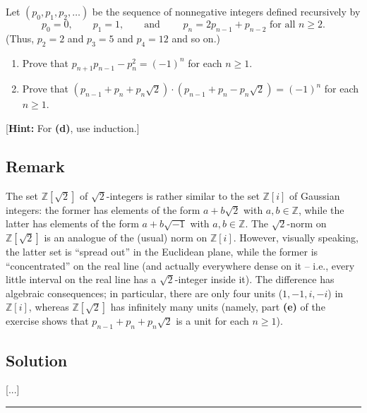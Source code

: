 \documentclass[paper=a4, fontsize=12pt]{scrartcl} %
\newcommand{\ZZ}{\mathbb{Z}} %
\newcommand{\tup}[1]{\left( #1 \right)}
\newcommand{\ive}[1]{\left[ #1 \right]}
\newcommand{\horrule}[1]{\rule{\linewidth}{#1}} %
\theoremstyle{plainsl}
\theoremstyle{definition}
\theoremstyle{remark}
\begin{document}
Let $\tup{p_0, p_1, p_2, \ldots}$ be the sequence of
nonnegative integers defined recursively by
\[
p_0 = 0, \qquad
p_1 = 1, \qquad
\text{and } \qquad
p_n = 2p_{n-1} + p_{n-2} \text{ for all } n \geq 2.
\]
(Thus, $p_2 = 2$ and $p_3 = 5$ and $p_4 = 12$ and so on.)

\begin{enumerate}

\item[\textbf{(d)}]
Prove that $p_{n+1} p_{n-1} - p_n^2 = \tup{-1}^n$
for each $n \geq 1$.

\item[\textbf{(e)}]
Prove that
$\tup{p_{n-1} + p_n + p_n \sqrt2} \cdot \tup{p_{n-1} + p_n - p_n \sqrt2} = \tup{-1}^n$
for each $n \geq 1$.

\end{enumerate}

[\textbf{Hint:} For \textbf{(d)}, use induction.]

\subsection{Remark}

The set $\ZZ\ive{\sqrt2}$ of $\sqrt2$-integers
is rather similar to the set
$\ZZ\ive{i}$ of Gaussian integers: the former has elements
of the form $a + b\sqrt2$ with $a, b \in \ZZ$,
while the latter has elements of the form
$a + b\sqrt{-1}$ with $a, b \in \ZZ$.
The $\sqrt2$-norm on $\ZZ\ive{\sqrt2}$ is an analogue of
the (usual) norm on $\ZZ\ive{i}$.
However, visually speaking, the latter set is ``spread
out'' in the Euclidean plane, while the former is
``concentrated'' on the real line (and actually everywhere
dense on it -- i.e., every little interval on the real
line has a $\sqrt2$-integer inside it).
The difference has algebraic consequences; in particular,
there are only four units ($1, -1, i, -i$) in $\ZZ\ive{i}$,
whereas $\ZZ\ive{\sqrt2}$ has infinitely many units
(namely, part \textbf{(e)} of the exercise shows that
$p_{n-1} + p_n + p_n \sqrt2$ is a unit for each $n \geq 1$).

\subsection{Solution}

[...]

\horrule{0.3pt} \\[0.4cm]
\end{document}
